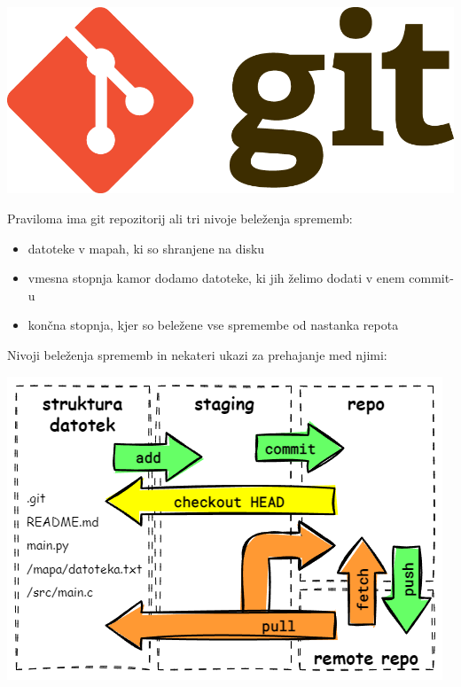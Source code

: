 \documentclass{article}
\begin{document}
\begin{multicols*}{2}

    \includegraphics[width=0.6\linewidth]{images/Git-Logo-2Color.png} 


\begin{textbox}[black]
Praviloma ima git repozitorij ali  tri nivoje beleženja sprememb:

\begin{itemize}[leftmargin=10pt]
    \item {} datoteke v mapah, ki so shranjene na disku
    \item {} vmesna stopnja kamor dodamo datoteke, ki jih želimo dodati v enem commit-u
    \item {} končna stopnja, kjer so beležene vse spremembe od nastanka repota
\end{itemize}
Nivoji beleženja sprememb in nekateri ukazi za prehajanje med njimi:
\begin{center}
    \includegraphics[width=0.8\linewidth]{images/git-skica.png}
\end{center}
\end{textbox}



\end{multicols*}
\end{document}
